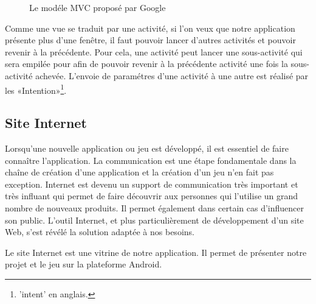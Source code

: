 \documentclass[a4paper,11pt,french]{article}
\def\android{Android\texttrademark{}}
\begin{document}
\begin{figure}[h!]
  \begin{center}
    \caption{Le modéle MVC proposé par Google}
    \label{fig:MVC}
  \end{center}
\end{figure}

Comme une vue se traduit par une activité, si l'on veux que notre application présente plus d'une fenêtre, il faut pouvoir lancer d'autres activités et pouvoir revenir à la précédente. Pour cela, une activité peut lancer une sous-activité qui sera empilée pour afin de pouvoir revenir à la précédente activité une fois la sous-activité achevée. L'envoie de paramétres d'une activité à une autre est réalisé par les «Intention»\footnote{'intent' en anglais.}.




\subsection{Site Internet}

Lorsqu'une nouvelle application ou jeu est développé, il est essentiel de faire connaître l'application.
La communication est une étape fondamentale dans la chaîne de création d'une application et la création d'un jeu n'en fait pas exception.
Internet est devenu un support de communication très important et très influant qui permet de faire découvrir aux
personnes qui l'utilise un grand nombre de nouveaux produits. Il permet également dans certain cas d'influencer son public.
L'outil Internet, et plus particulièrement de développement d'un site Web, s'est révélé la solution adaptée à nos besoins.

Le site Internet est une vitrine de notre application. Il permet de présenter notre projet et le jeu sur la plateforme \android{}.
\end{document}
